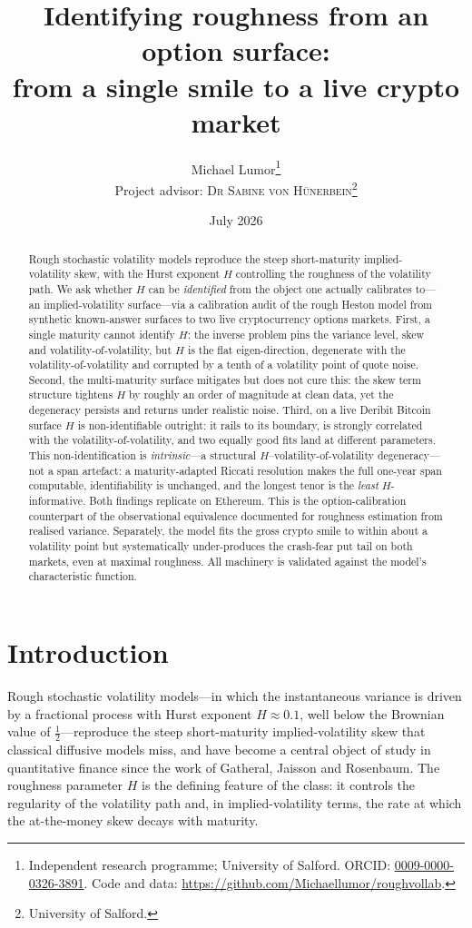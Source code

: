 \documentclass[11pt]{article}
\title{Identifying roughness from an option surface:\\
from a single smile to a live crypto market}
\author{Michael Lumor\thanks{Independent research programme; University of
Salford. ORCID: \href{https://orcid.org/0009-0000-0326-3891}{0009-0000-0326-3891}.
Code and data: \url{https://github.com/Michaellumor/roughvollab}.}\\[0.4em]
\normalsize Project advisor: \textsc{Dr Sabine von H\"unerbein}\thanks{University of Salford.}}
\date{July 2026}
\begin{document}
\maketitle

\begin{abstract}
Rough stochastic volatility models reproduce the steep short-maturity implied-volatility
skew, with the Hurst exponent $H$ controlling the roughness of the volatility path. We ask
whether $H$ can be \emph{identified} from the object one actually calibrates to---an
implied-volatility surface---via a calibration audit of the rough Heston model from
synthetic known-answer surfaces to two live cryptocurrency options markets. First, a
single maturity cannot identify $H$: the inverse problem pins the variance level, skew and
volatility-of-volatility, but $H$ is the flat eigen-direction, degenerate with the
volatility-of-volatility and corrupted by a tenth of a volatility point of quote noise.
Second, the multi-maturity surface mitigates but does not cure this: the skew term
structure tightens $H$ by roughly an order of magnitude at clean data, yet the degeneracy
persists and returns under realistic noise. Third, on a live Deribit Bitcoin surface $H$
is non-identifiable outright: it rails to its boundary, is strongly correlated with the
volatility-of-volatility, and two equally good fits land at different parameters. This non-identification
is \emph{intrinsic}---a structural $H$--volatility-of-volatility degeneracy---not a span
artefact: a maturity-adapted Riccati resolution makes the full one-year span computable,
identifiability is unchanged, and the longest tenor is the \emph{least} $H$-informative.
Both findings replicate on Ethereum. This is the option-calibration counterpart of the
observational equivalence documented for roughness estimation from realised variance.
Separately, the model fits the gross crypto smile to within about a volatility point but
systematically under-produces the crash-fear put tail on both markets, even at maximal
roughness. All machinery is validated against the model's characteristic function.
\end{abstract}

\section{Introduction}\label{sec:intro}

Rough stochastic volatility models---in which the instantaneous variance is driven by a
fractional process with Hurst exponent $H\approx 0.1$, well below the Brownian value of
$\tfrac12$---reproduce the steep short-maturity implied-volatility skew that classical
diffusive models miss, and have become a central object of study in quantitative finance
since the work of Gatheral, Jaisson and Rosenbaum. The roughness parameter $H$ is the
defining feature of the class: it controls the regularity of the volatility path and, in
implied-volatility terms, the rate at which the at-the-money skew decays with maturity.
\end{document}
